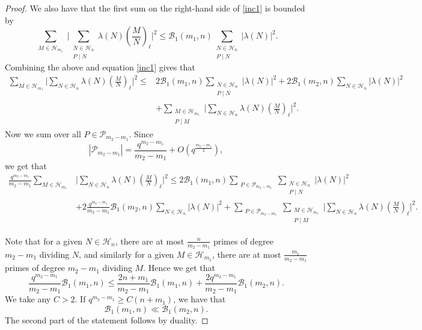 \documentclass[12pt]{amsart}
\newcommand{\legl}[2]{\left( \frac{#1}{#2} \right)_\ell}
\begin{document}
\begin{proof}
We also have that the first sum on the right-hand side of \eqref{inc1} is bounded by
\begin{equation*}
\sum_{\substack{M \in \mathcal{H}_{m_1}}} \Big| \sum_{\substack{N \in \mathcal{H}_n \\ P\mid N}} \lambda(N) \legl{M}{N} \Big|^2 \leq \mathcal{B}_1(m_1,n) \sum_{\substack{N \in \mathcal{H}_n \\ P\mid N}} |\lambda(N)|^2.
\end{equation*}
Combining the above and equation \eqref{inc1} gives that
\begin{align*}
\sum_{M \in \mathcal{H}_{m_1}}  \Big| \sum_{N \in \mathcal{H}_n} \lambda(N) \legl{M}{N} \Big|^2  \leq&   2 \mathcal{B}_1(m_1,n) \sum_{\substack{N \in \mathcal{H}_n \\ P\mid N}} |\lambda(N)|^2 + 2 \mathcal{B}_1(m_2,n) \sum_{N \in \mathcal{H}_n} |\lambda(N)|^2\\&+  \sum_{\substack{M \in \mathcal{H}_{m_1} \\ P \mid  M}} \Big| \sum_{N \in \mathcal{H}_n } \lambda(N) \legl{M}{N}  \Big|^2.
\end{align*}
Now we sum over all $P \in \mathcal{P}_{m_2-m_1}$. Since $$| \mathcal{P}_{m_2-m_1}| = \frac{q^{m_2-m_1}}{m_2-m_1} + O(q^{\frac{m_2-m_1}{2}}),$$ we get that
\begin{align*}
\frac{q^{m_2-m_1}}{m_2-m_1} \sum_{M \in \mathcal{H}_{m_1}} & \Big| \sum_{N \in \mathcal{H}_n} \lambda(N) \legl{M}{N} \Big|^2 \leq 2 \mathcal{B}_1(m_1,n) \sum_{\substack{P \in \mathcal{P}_{m_2-m_1}}}\sum_{\substack{N \in \mathcal{H}_n \\ P\mid N}} |\lambda (N)|^2\\&  + 2\frac{q^{m_2-m_1}}{m_2-m_1} \mathcal{B}_1(m_2,n) \sum_{N \in \mathcal{H}_n} |\lambda(N)|^2  + \sum_{\substack{P \in \mathcal{P}_{m_2-m_1}}}\sum_{\substack{M \in \mathcal{H}_{m_1} \\ P \mid M}} \Big| \sum_{N \in \mathcal{H}_n } \lambda(N) \legl{M}{N} \Big|^2.
\end{align*}

Note that for a given $N \in \mathcal{H}_n$, there are at most $\frac{n}{m_2-m_1}$ primes of degree $m_2-m_1$ dividing $N$, and similarly for a given $M \in \mathcal{H}_{m_1}$, there are at most $\frac{m_1}{m_2-m_1}$ primes of degree $m_2-m_1$ dividing $M$. Hence we get that
$$\frac{q^{m_2-m_1}}{m_2-m_1}  \mathcal{B}_1(m_1,n) \leq \frac{2n+m_1}{m_2-m_1} \mathcal{B}_1(m_1,n) +\frac{2 q^{m_2-m_1}}{m_2-m_1} \mathcal{B}_1(m_2,n).$$
We take any $C> 2$. If  $q^{m_2-m_1} \geq C (n+m_1)$, we have that $$\mathcal{B}_1(m_1,n) \ll \mathcal{B}_1(m_2,n).$$
The second part of the statement follows by duality.
\end{proof}
\end{document}
